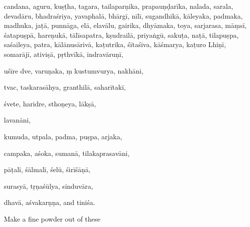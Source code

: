 \begin{translation}
\gls{candana}, \gls{aguru},  \gls{kuṣṭha},  \gls{tagara},  
\gls{tailaparṇika}, 
\gls{prapauṇḍarīka},  
\gls{nalada},  
\gls{sarala},  
\gls{devadāru}, 
\gls{bhadraśriya},  
\gls{yavaphalā},  
\gls{bhārgī}, 
\gls{nīlī},  
\gls{sugandhikā}, 
\gls{kāleyaka},  
\gls{padmaka},  
\gls{madhuka},  
 \gls{jaṭā}, 
\gls{punnāga},
\gls{elā},  
\gls{elavālu},  \gls{gairika},  \gls{dhyāmaka},  
\gls{toya},  
\gls{sarjarasa}, 
\gls{māṃsī},  
\gls{śatapuṣpā},%
\gls{hareṇukā},%
\gls{tālīsapatra},%
\gls{kṣudrailā},  %
\gls{priyaṅgū},  %
\gls{sakuṭa},  %
\gls{naṭā}, %
\gls{tilapuṣpa},%
\gls{saśaileya},  %
\gls{patra},  
\gls{kālānusārivā},%
\gls{kaṭutrika},  %
\gls{śītaśiva},  %
\gls{kāśmarya},  %
\gls{kaṭuro Lhiṇī}, %
\gls{somarājī},  %
\gls{ativiṣā},  
\gls{pṛthvīkā},  
\gls{indravāruṇī}, 

\gls{uśīre dve},  
\gls{varuṇaka}, ṃ 
\gls{kustumvurya},  
\gls{nakhāni},  


\gls{tvac},  
\gls{taskarasāhya},  
\gls{granthilā},  
\gls{saharītakī}, 


\gls{śvete},  
\gls{haridre}, 
\gls{ sthoṇeya},  
\gls{lākṣā},   

\gls{lavanāni}, 


\gls{kumuda},  
\gls{utpala},  
\gls{padma},  
\gls{puṣpa},  
\gls{arjaka}, 


\gls{campaka},  
\gls{aśoka},  
\gls{sumanā},  
\gls{tilakaprasavāni}, 


\gls{pāṭalī},  
\gls{śālmalī},  
\gls{śelū},  
\gls{śirīśāṇā},  


\gls{surasyā},  
\gls{tṛṇaśūlya},  
\gls{sinduvāra}, 


\gls{dhavā},  
\gls{aśvakarṇṇa},  and 
\gls{tiniśa}.

Make a fine powder out of these


\end{translation}
